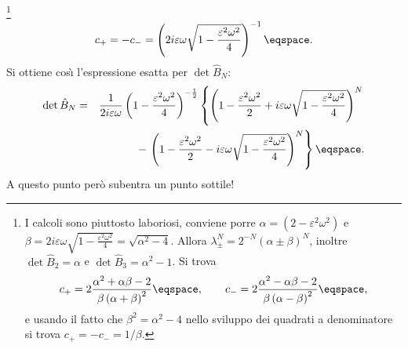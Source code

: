 \footnote{I calcoli sono piuttosto laboriosi, conviene porre $\alpha = \left( 2 -\varepsilon^{2}
\omega^{2}\right) $ e $ \beta = 2 i \varepsilon \omega \sqrt{ 1 - \frac{\varepsilon^{2}
\omega^{2}}{4} } = \sqrt{\alpha^{2} - 4}$. Allora $\lambda_{\pm} ^{N} = 2^{-N}
(\alpha\pm\beta)^{N}$, inoltre $\det \hat{B}_{2} = \alpha$ e
$\det\hat{B}_{3} = \alpha^{2} -1$.
Si trova
\begin{displaymath}
c_{+} = 2 \frac{ \alpha^{2} + \alpha \beta - 2}{\beta \left(
\alpha+\beta\right)^{2}} \eqspace , \qquad 
c_{-} = 2 \frac{ \alpha^{2} - \alpha \beta -2 } {\beta \left( \alpha-
\beta\right)^{2}} \eqspace, 
\end{displaymath}
e usando il fatto che $\beta^{2} = \alpha^{2} - 4$ nello sviluppo dei quadrati a
denominatore si trova $c_{+} = -c_{-} = 1 /\beta $.}
\begin{displaymath}
c_{+} = -c_{-} = \left( 2 i \varepsilon \omega \sqrt{ 1 - \frac{\varepsilon^{2}
\omega^{2}}{4}} \right)^{-1} \eqspace .
\end{displaymath}
Si ottiene cos\`{\i} l'espressione esatta per $\det\hat{B}_{N}$:
\begin{eqnarray*}
\det\hat{B}_{N} 
&=& \frac{1}{2i\varepsilon \omega}
\left(  1 - \frac{\varepsilon^{2} \omega^{2}}{4} \right)^{ - \frac{1}{2}}
\left\{ 
\left( 1 - \frac{\varepsilon^{2} \omega^{2}}{2} + i \varepsilon \omega
\sqrt{ 1 - \frac{\varepsilon^{2} \omega^{2}}{4} } \right)^{N}  \right.
\\
&&{}- \left.
\left( 1 - \frac{\varepsilon^{2} \omega^{2}}{2} - i \varepsilon \omega
\sqrt{ 1 - \frac{\varepsilon^{2} \omega^{2}}{4} } \right)^{N} \right\} \eqspace
.
\end{eqnarray*}
A questo punto per\`o subentra un punto sottile!

